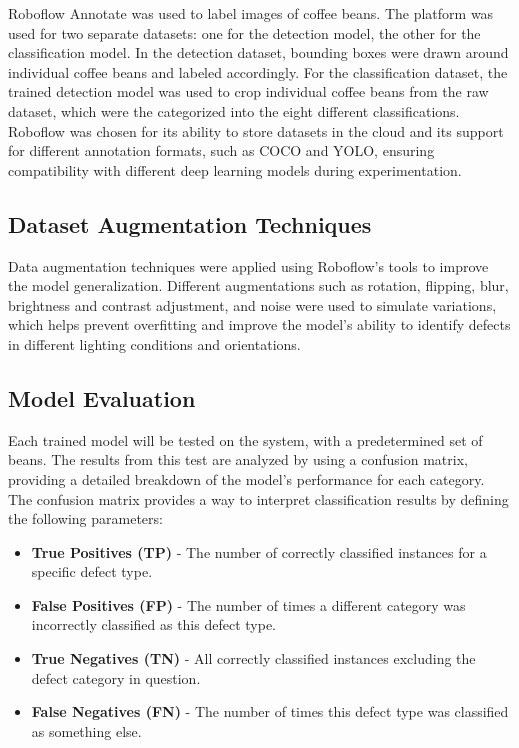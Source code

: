 Roboflow Annotate was used to label images of coffee beans. The platform was used for two separate datasets: one for the detection model, the other for the classification model. In the detection dataset, bounding boxes were drawn around individual coffee beans and labeled accordingly. For the classification dataset, the trained detection model was used to crop individual coffee beans from the raw dataset, which were the categorized into the eight different classifications. Roboflow was chosen for its ability to store datasets in the cloud and its support for different annotation formats, such as COCO and YOLO, ensuring compatibility with different deep learning models during experimentation.

\subsection{Dataset Augmentation Techniques}

Data augmentation techniques were applied using Roboflow’s tools to improve the model generalization. Different augmentations such as rotation, flipping, blur, brightness and contrast adjustment, and noise were used to simulate variations, which helps prevent overfitting and improve the model’s ability to identify defects in different lighting conditions and orientations.

\subsection{Model Evaluation}
Each trained model will be tested on the system, with a predetermined set of beans. The results from this test are analyzed by using a confusion matrix, providing a detailed breakdown of the model’s performance for each category. The confusion matrix provides a way to interpret classification results by defining the following parameters:
\begin{itemize}
    \item \textbf{True Positives (TP)} - The number of correctly classified instances for a specific defect type.
    \item \textbf{False Positives (FP)} - The number of times a different category was incorrectly classified as this defect type.
    \item \textbf{True Negatives (TN)} - All correctly classified instances excluding the defect category in question.
    \item \textbf{False Negatives (FN)} - The number of times this defect type was classified as something else.
\end{itemize}

